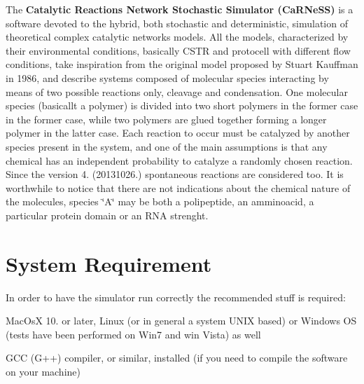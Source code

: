 

 The {\bfseries Catalytic Reactions Network Stochastic Simulator (Ca\-R\-Ne\-S\-S)} is a software devoted to the hybrid, both stochastic and deterministic, simulation of theoretical complex catalytic networks models. All the models, characterized by their environmental conditions, basically C\-S\-T\-R and protocell with different flow conditions, take inspiration from the original model proposed by Stuart Kauffman in 1986, and describe systems composed of molecular species interacting by means of two possible reactions only, cleavage and condensation. One molecular species (basicallt a polymer) is divided into two short polymers in the former case in the former case, while two polymers are glued together forming a longer polymer in the latter case. Each reaction to occur must be catalyzed by another species present in the system, and one of the main assumptions is that any chemical has an independent probability to catalyze a randomly chosen reaction. Since the version 4. (20131026.) spontaneous reactions are considered too. It is worthwhile to notice that there are not indications about the chemical nature of the molecules, species \char`\"{}\-A\char`\"{} may be both a polipeptide, an amminoacid, a particular protein domain or an R\-N\-A strenght.\par
\par
 \hypertarget{a00002_sysreq}{}\section{System Requirement}\label{a00002_sysreq}


 In order to have the simulator run correctly the recommended stuff is required\-:
\begin{DoxyItemize}
\item Mac\-Os\-X 10. or later, Linux (or in general a system U\-N\-I\-X based) or Windows O\-S (tests have been performed on Win7 and win Vista) as well
\item G\-C\-C (G++) compiler, or similar, installed (if you need to compile the software on your machine)
\end{DoxyItemize}

